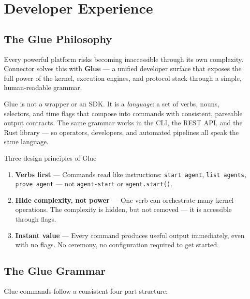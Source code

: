 \chapter{Developer Experience}

\section{The Glue Philosophy}

Every powerful platform risks becoming inaccessible through its own complexity.
Connector solves this with \textbf{Glue} — a unified developer surface that
exposes the full power of the kernel, execution engines, and protocol stack
through a simple, human-readable grammar.

Glue is not a wrapper or an SDK. It is a \emph{language}: a set of verbs,
nouns, selectors, and time flags that compose into commands with consistent,
parseable output contracts. The same grammar works in the CLI, the REST API,
and the Rust library — so operators, developers, and automated pipelines all
speak the same language.

\begin{conceptbox}{Three design principles of Glue}
\begin{enumerate}[noitemsep]
  \item \textbf{Verbs first} — Commands read like instructions: \texttt{start agent}, \texttt{list agents}, \texttt{prove agent} — not \texttt{agent-start} or \texttt{agent.start()}.
  \item \textbf{Hide complexity, not power} — One verb can orchestrate many kernel operations. The complexity is hidden, but not removed — it is accessible through flags.
  \item \textbf{Instant value} — Every command produces useful output immediately, even with no flags. No ceremony, no configuration required to get started.
\end{enumerate}
\end{conceptbox}

\section{The Glue Grammar}

Glue commands follow a consistent four-part structure:

